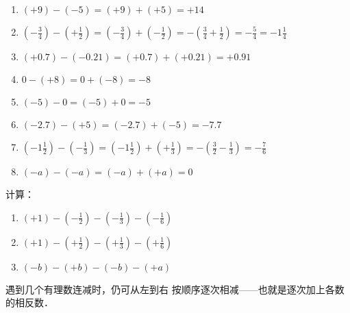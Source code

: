 \begin{solution}
\begin{enumerate}
        \item $(+9)-(-5)=(+9)+(+5)=+14$
        \item $\left(-\frac{3}{4}\right)-\left(+\frac{1}{2}\right)=\left(-\frac{3}{4}\right)+\left(-\frac{1}{2}\right)=-\left(\frac{3}{4}+\frac{1}{2}\right)=-\frac{5}{4}=-1\frac{1}{4}$
        \item $(+0.7)-(-0.21)=(+0.7)+(+0.21)=+0.91$
        \item $0-(+8)=0+(-8)=-8$
        \item $(-5)-0=(-5)+0=-5$
        \item $(-2.7)-(+5)=(-2.7)+(-5)=-7.7$
        \item $\left(-1\frac{1}{2}\right)-\left(-\frac{1}{3}\right)=\left(-1\frac{1}{2}\right)+\left(+\frac{1}{3}\right)=-\left(\frac{3}{2}-\frac{1}{3}\right)=-\frac{7}{6}$
        \item $(-a)-(-a)=(-a)+(+a)=0$
    \end{enumerate}    
\end{solution}

\begin{example}
    计算：
\begin{enumerate}
    \item $(+1)-\left(-\frac{1}{2}\right)-\left(-\frac{1}{3}\right)-\left(-\frac{1}{6}\right)$
    \item $(+1)-\left(+\frac{1}{2}\right)-\left(+\frac{1}{3}\right)-\left(+\frac{1}{6}\right)$
    \item $(-b)-(+b)-(-b)-(+a)$
\end{enumerate}
\end{example}

\begin{analyze}
遇到几个有理数连减时，仍可从左到右
按顺序逐次相减——也就是逐次加上各数的相反数．
\end{analyze}

